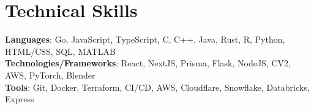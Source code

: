 \documentclass[letterpaper,11pt]{article}
\makeatletter
\newcommand{\resumeItem}[1]{
  \item\small{
    {#1 \vspace{-2pt}}
  }
}
\newcommand{\resumeSubheading}[4]{
  \vspace{-2pt}\item
    \begin{tabular*}{1.0\textwidth}[t]{l@{\extracolsep{\fill}}r}
      \small#1 & \textbf{\small #2} \\
      \textit{\small#3} & \textit{\small #4} \\
    \end{tabular*}\vspace{-9pt}
}
\newcommand{\resumeSubHeadingListStart}{\begin{itemize}[leftmargin=0.0in, label={}]}
\newcommand{\resumeItemListStart}{\begin{itemize}}
\newcommand{\resumeItemListEnd}{\end{itemize}\vspace{-5pt}}
\makeatother
\begin{document}
\vspace{-17pt}
\section{Technical Skills}
 \begin{itemize}[leftmargin=0.15in, label={}]
    \small{\item{
      \begin{comment}
        Languages:
        - Go
        - JavaScript
        - TypeScript
        - C
        - C++
        - Java
        - Rust
        - R
        - Python
        - HTML/CSS
        - SQL
        - MATLAB

        Technologies/Frameworks:
        - Linux
        - Bootstrap
        - NextJS
        - React
        - Prisma
        - Flask
        - Node
        - CV2
        - AWS
        - PyTorch
        - Blender

        Tools:
        - Git
        - Docker
        - Terraform
        - CI/CD
        - AWS
        - Cloudflare
        - Snowflake
        - Databricks
        - Express
      \end{comment}
      \textbf{Languages}{: Go, JavaScript, TypeScript, C, C++, Java, Rust, R, Python, HTML/CSS, SQL, MATLAB} \\
      \textbf{Technologies/Frameworks}{: React, NextJS, Prisma, Flask, NodeJS, CV2, AWS, PyTorch, Blender} \\
      \textbf{Tools}{: Git, Docker, Terraform, CI/CD, AWS, Cloudflare, Snowflake, Databricks, Express} \\
    }}
 \end{itemize}
\vspace{-20pt}


        
\end{document}
